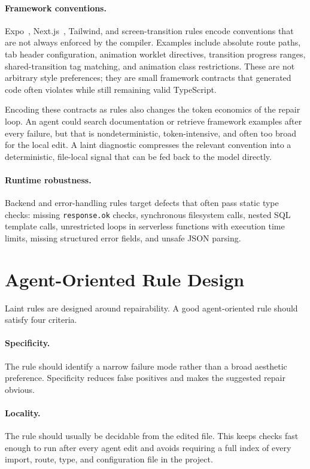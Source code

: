 \documentclass[11pt]{article}
\begin{document}
\paragraph{Framework conventions.}
Expo~\cite{expo}, Next.js~\cite{nextjs}, Tailwind, and screen-transition rules encode conventions that are not always enforced by the compiler. Examples include absolute route paths, tab header configuration, animation worklet directives, transition progress ranges, shared-transition tag matching, and animation class restrictions. These are not arbitrary style preferences; they are small framework contracts that generated code often violates while still remaining valid TypeScript.

Encoding these contracts as rules also changes the token economics of the repair loop. An agent could search documentation or retrieve framework examples after every failure, but that is nondeterministic, token-intensive, and often too broad for the local edit. A laint diagnostic compresses the relevant convention into a deterministic, file-local signal that can be fed back to the model directly.

\paragraph{Runtime robustness.}
Backend and error-handling rules target defects that often pass static type checks: missing \texttt{response.ok} checks, synchronous filesystem calls, nested SQL template calls, unrestricted loops in serverless functions with execution time limits, missing structured error fields, and unsafe JSON parsing.

\section{Agent-Oriented Rule Design}

Laint rules are designed around repairability. A good agent-oriented rule should satisfy four criteria.

\paragraph{Specificity.}
The rule should identify a narrow failure mode rather than a broad aesthetic preference. Specificity reduces false positives and makes the suggested repair obvious.

\paragraph{Locality.}
The rule should usually be decidable from the edited file. This keeps checks fast enough to run after every agent edit and avoids requiring a full index of every import, route, type, and configuration file in the project.
\end{document}
